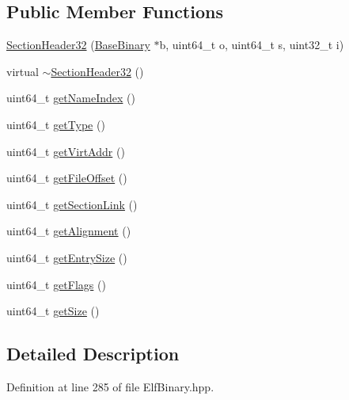 \subsection*{\-Public \-Member \-Functions}
\begin{DoxyCompactItemize}
\item 
\hyperlink{class_e_p_a_x_1_1_elf_1_1_section_header32_a03a69e255bde29bc1c035fd8a3800e0d}{\-Section\-Header32} (\hyperlink{class_e_p_a_x_1_1_base_binary}{\-Base\-Binary} $\ast$b, uint64\-\_\-t o, uint64\-\_\-t s, uint32\-\_\-t i)
\item 
virtual \hyperlink{class_e_p_a_x_1_1_elf_1_1_section_header32_ad40d1aaf6684064eb553cf6eea466773}{$\sim$\-Section\-Header32} ()
\item 
uint64\-\_\-t \hyperlink{class_e_p_a_x_1_1_elf_1_1_section_header32_a03ea8c9bb8bb24b88f75158085ef557e}{get\-Name\-Index} ()
\item 
uint64\-\_\-t \hyperlink{class_e_p_a_x_1_1_elf_1_1_section_header32_a84ed73ec4cb58e9919222a884dbe0cd3}{get\-Type} ()
\item 
uint64\-\_\-t \hyperlink{class_e_p_a_x_1_1_elf_1_1_section_header32_a0d804e41f351baa2a0165e705e84ce86}{get\-Virt\-Addr} ()
\item 
uint64\-\_\-t \hyperlink{class_e_p_a_x_1_1_elf_1_1_section_header32_a10cf04485e82a2f38b852732345dcd29}{get\-File\-Offset} ()
\item 
uint64\-\_\-t \hyperlink{class_e_p_a_x_1_1_elf_1_1_section_header32_ad60ce4da7aa979dcf82115920f3b3664}{get\-Section\-Link} ()
\item 
uint64\-\_\-t \hyperlink{class_e_p_a_x_1_1_elf_1_1_section_header32_a36d45234fbdfd27ac89e449f0084e985}{get\-Alignment} ()
\item 
uint64\-\_\-t \hyperlink{class_e_p_a_x_1_1_elf_1_1_section_header32_adbddf01ab8a4115d7c07dfe92e2160c6}{get\-Entry\-Size} ()
\item 
uint64\-\_\-t \hyperlink{class_e_p_a_x_1_1_elf_1_1_section_header32_a6235f57290293d0836cee2adadf7c924}{get\-Flags} ()
\item 
uint64\-\_\-t \hyperlink{class_e_p_a_x_1_1_elf_1_1_section_header32_a04f7dbe427fb6c19261b5de7cbacfd05}{get\-Size} ()
\end{DoxyCompactItemize}


\subsection{\-Detailed \-Description}


\-Definition at line 285 of file \-Elf\-Binary.\-hpp.



